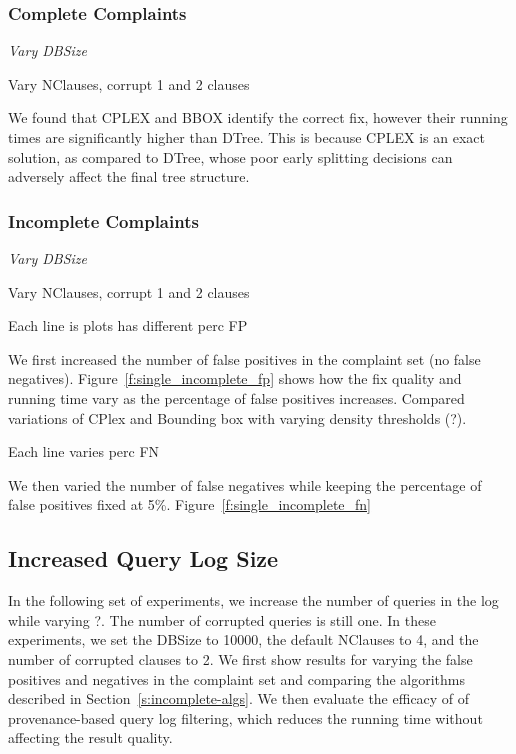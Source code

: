 \subsubsection{Complete Complaints}

{\it Vary DBSize

Vary NClauses, corrupt 1 and 2 clauses
}

We found that CPLEX and BBOX identify the correct fix, however their
running times are significantly higher than DTree.  This is because
CPLEX is an exact solution, as compared to DTree, whose poor early
splitting decisions can adversely affect the final tree structure.

\subsubsection{Incomplete Complaints}


{\it 
Vary DBSize

Vary NClauses, corrupt 1 and 2 clauses

Each line is plots has different perc FP
}

We first increased the number of false positives in the complaint set (no false negatives).
Figure~\ref{f:single_incomplete_fp} shows how the fix quality and running time vary as the
percentage of false positives increases.   Compared variations of CPlex and Bounding box with varying
density thresholds (?).

Each line varies perc FN

We then varied the number of false negatives while keeping the percentage of false positives fixed at 5\%.
Figure~\ref{f:single_incomplete_fn} 


\subsection{Increased Query Log Size}

In the following set of experiments, we increase the number of
queries in the log while varying ?.  The number of corrupted queries
is still one.  In these experiments, we set the DBSize to 10000,
the default NClauses to 4, and the number of corrupted clauses to
2.   We first show results for varying the false positives and
negatives in the complaint set and comparing the algorithms described
in Section~\ref{s:incomplete-algs}.  We then evaluate the efficacy
of of provenance-based query log filtering, which reduces the running
time without affecting the result quality.

